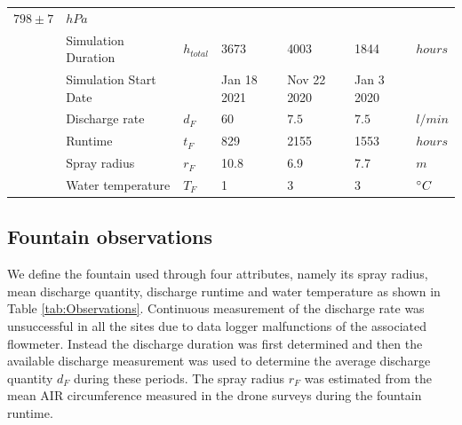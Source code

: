 \documentclass[utf8]{frontiersSCNS}
\begin{document}
\begin{table}
\begin{tabular}{@{}|lllllll|@{}}
		$798 \pm7$             & $hPa$                                                                                                     \\
		\multicolumn{1}{|l|}{} & Simulation Duration         & $h_{total} $    & 3673          & 4003
		                       & 1844                        & $hours$                                                                     \\
		\multicolumn{1}{|l|}{} & Simulation Start Date         &     & Jan 18 2021   & Nov 22 2020
		                       & Jan 3 2020                       &                                                                      \\\bottomrule
		\multicolumn{1}{|l|}{\multirow{4}{*}{\rotatebox[origin=c]{90}{Fountain}}}
		                       & Discharge rate             & $d_F     $      & $60$          & $7.5$        &
		$7.5$                  & $l/min$                                                                                                   \\
		\multicolumn{1}{|l|}{} & Runtime                     & $t_F $          & 829           & 2155
		                       & 1553                        & $hours$                                                                     \\
		\multicolumn{1}{|l|}{} & Spray radius                & $r_{F}$         & 10.8          & 6.9
		                       & 7.7                         & $m$                                                                         \\
		\multicolumn{1}{|l|}{} & Water temperature           & $T_{F}$         & 1             & 3
		                       & 3                           & $\degree C$                                                                 \\\midrule
	\end{tabular}
\end{table}


\subsection{Fountain observations}

We define the fountain used through four attributes, namely its spray radius, mean discharge quantity, discharge
runtime and water temperature as shown in Table \ref{tab:Observations}. Continuous measurement of the discharge
rate was unsuccessful in all the sites due to data logger malfunctions of the associated flowmeter. Instead the
discharge duration was first determined and then the available discharge measurement was used to determine the
average discharge quantity $d_F$ during these periods.  The spray radius $r_F$ was estimated from the mean AIR
circumference measured in the drone surveys during the fountain runtime.
\end{document}
